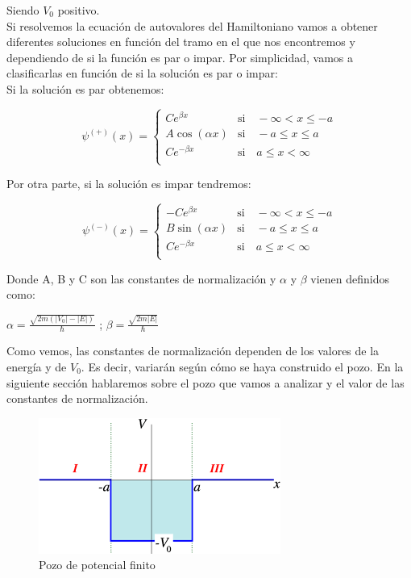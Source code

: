 \documentclass[12pt]{article}
\begin{document}
Siendo $V_0$ positivo.\\

Si resolvemos la ecuación de autovalores del Hamiltoniano vamos
a obtener diferentes soluciones en función del tramo en el que 
nos encontremos y dependiendo de si la función es par o impar. Por simplicidad,
vamos a clasificarlas en función de si la solución es par o impar: \\

Si la solución es par obtenemos:

\begin{equation}
    \boxed{\psi^{(+)}(x)=\begin{cases} 
        C e^{\beta x} & \text{si} \quad -\infty < x \leq -a \\
        A\cos(\alpha x) & \text{si} \quad -a\leq x \leq a \\
        C e^{-\beta x} & \text{si} \quad a \leq x < \infty \\
     \end{cases}}
\end{equation}

Por otra parte, si la solución es impar tendremos:

\begin{equation}
    \boxed{\psi^{(-)}(x)=\begin{cases} 
        -C e^{\beta x} & \text{si} \quad -\infty < x \leq -a \\
        B\sin(\alpha x) & \text{si} \quad -a\leq x \leq a \\
        C e^{-\beta x} & \text{si} \quad a \leq x < \infty \\
     \end{cases}}
\end{equation}

Donde A, B y C son las constantes de normalización y $\alpha$ y $\beta$ vienen definidos como: 

\begin{center}
    $\alpha=\frac{\sqrt{2m(\left\lvert V_0 \right\rvert-\left\lvert E \right\rvert)}}{\hbar}$
\hspace{0.3cm};\hspace{0.3cm} $\beta=\frac{\sqrt{2m\left\lvert E \right\rvert}}{\hbar}$ 
\end{center}

Como vemos, las constantes de normalización dependen de los  valores de la energía y de $V_0$. Es decir, variarán según cómo se haya construido el pozo. En la siguiente sección hablaremos sobre el pozo que vamos a analizar y el valor de las constantes de normalización.
\begin{figure}[H]
    \centering
    \includegraphics{images.png}
    \caption{Pozo de potencial finito}
    \label{fig:etiqueta}
\end{figure}
\end{document}
